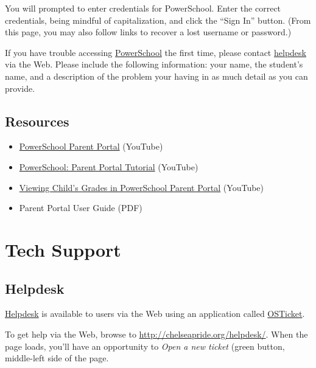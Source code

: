 \documentclass[letterpaper,10pt,english]{sphinxmanual}
\begin{document}
You will prompted to enter credentials for PowerSchool. Enter the correct credentials, being mindful of capitalization, and click the ``Sign In'' button. (From this page, you may also follow links to recover a lost username or password.)

If you have trouble accessing \href{http://chelseaschool.powerschool.com/}{PowerSchool} the first time, please contact \href{http://chelseapride.org/helpdesk}{helpdesk} via the Web. Please include the following information: your name, the student's name, and a description of the problem your having in as much detail as you can provide.


\section{Resources}
\label{powerschool:resources}\begin{itemize}
\item {} 
\href{http://youtu.be/SzF4wF4fglY}{PowerSchool Parent Portal} (YouTube)

\item {} 
\href{http://youtu.be/7z5rOk-89OE}{PowerSchool: Parent Portal Tutorial} (YouTube)

\item {} 
\href{http://youtu.be/YFS0n2D8ri4}{Viewing Child's Grades in PowerSchool Parent Portal} (YouTube)

\item {} 
Parent Portal User Guide (PDF)

\end{itemize}


\chapter{Tech Support}
\label{helpdesk::doc}\label{helpdesk:tech-support}\label{helpdesk:index-0}

\section{Helpdesk}
\label{helpdesk:helpdesk}
\href{http://chelseapride.org/helpdesk/}{Helpdesk} is available to users via the Web using an application called \href{http://chelseapride.org/helpdesk/}{OSTicket}.

To get help via the Web, browse to \href{http://chelseapride.org/helpdesk/}{http://chelseapride.org/helpdesk/}. When the page loads, you'll have an opportunity to \emph{Open a new ticket} (green button, middle-left side of the page.
\end{document}
